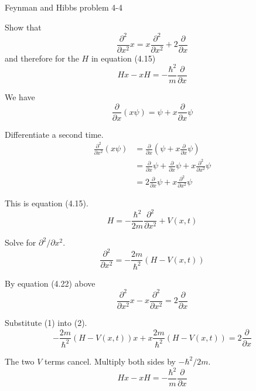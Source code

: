 \documentclass[12pt]{article}
\begin{document}
\begin{center}
Feynman and Hibbs problem 4-4
\end{center}

Show that
\begin{equation*}
\frac{\partial^2}{\partial x^2}x=x\frac{\partial^2}{\partial x^2}+2\frac{\partial}{\partial x}
\tag{4.22}
\end{equation*}
and therefore for the $H$ in equation (4.15)
\begin{equation*}
Hx-xH=-\frac{\hbar^2}{m}\frac{\partial}{\partial x}
\end{equation*}

We have
\begin{equation*}
\frac{\partial}{\partial x}(x\psi)=\psi+x\frac{\partial}{\partial x}\psi
\end{equation*}

Differentiate a second time.
\begin{align*}
\frac{\partial^2}{\partial x^2}(x\psi)
&=\frac{\partial}{\partial x}\left(\psi+x\frac{\partial}{\partial x}\psi\right)
\\
&=\frac{\partial}{\partial x}\psi+\frac{\partial}{\partial x}\psi+x\frac{\partial^2}{\partial x^2}\psi
\\
&=2\frac{\partial}{\partial x}\psi+x\frac{\partial^2}{\partial x^2}\psi
\end{align*}

This is equation (4.15).
\begin{equation*}
H=-\frac{\hbar^2}{2m}\frac{\partial^2}{\partial x^2}+V(x,t)
\end{equation*}

Solve for $\partial^2/\partial x^2$.
\begin{equation*}
\frac{\partial^2}{\partial x^2}=-\frac{2m}{\hbar^2}(H-V(x,t))
\tag{1}
\end{equation*}

By equation (4.22) above
\begin{equation*}
\frac{\partial^2}{\partial x^2}x-x\frac{\partial^2}{\partial x^2}=2\frac{\partial}{\partial x}
\tag{2}
\end{equation*}

Substitute (1) into (2).
\begin{equation*}
-\frac{2m}{\hbar^2}(H-V(x,t))x+x\frac{2m}{\hbar^2}(H-V(x,t))=2\frac{\partial}{\partial x}
\end{equation*}

The two $V$ terms cancel.
Multiply both sides by $-\hbar^2/2m$.
\begin{equation*}
Hx-xH=-\frac{\hbar^2}{m}\frac{\partial}{\partial x}
\end{equation*}
\end{document}
